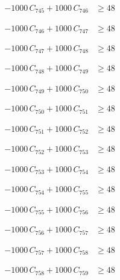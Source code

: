 \documentclass[a4paper,11pt]{article}
\begin{document}
\begin{align}
-1000\,C_{745} + 1000\,C_{746} &\geq 48 \nonumber
\end{align}

\begin{align}
-1000\,C_{746} + 1000\,C_{747} &\geq 48 \nonumber
\end{align}

\begin{align}
-1000\,C_{747} + 1000\,C_{748} &\geq 48 \nonumber
\end{align}

\begin{align}
-1000\,C_{748} + 1000\,C_{749} &\geq 48 \nonumber
\end{align}

\begin{align}
-1000\,C_{749} + 1000\,C_{750} &\geq 48 \nonumber
\end{align}

\begin{align}
-1000\,C_{750} + 1000\,C_{751} &\geq 48 \nonumber
\end{align}

\begin{align}
-1000\,C_{751} + 1000\,C_{752} &\geq 48 \nonumber
\end{align}

\begin{align}
-1000\,C_{752} + 1000\,C_{753} &\geq 48 \nonumber
\end{align}

\begin{align}
-1000\,C_{753} + 1000\,C_{754} &\geq 48 \nonumber
\end{align}

\begin{align}
-1000\,C_{754} + 1000\,C_{755} &\geq 48 \nonumber
\end{align}

\begin{align}
-1000\,C_{755} + 1000\,C_{756} &\geq 48 \nonumber
\end{align}

\begin{align}
-1000\,C_{756} + 1000\,C_{757} &\geq 48 \nonumber
\end{align}

\begin{align}
-1000\,C_{757} + 1000\,C_{758} &\geq 48 \nonumber
\end{align}

\begin{align}
-1000\,C_{758} + 1000\,C_{759} &\geq 48 \nonumber
\end{align}
\end{document}
